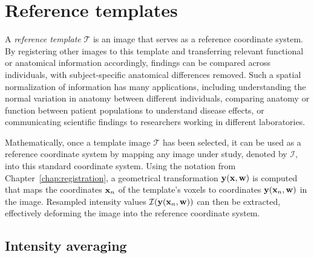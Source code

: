 \documentclass[10pt,twoside]{book}
\begin{document}
\section{Reference templates}
\label{sec:referenceTemplates}

A \emph{reference template} $\mathcal{T}$ is an image that serves as a reference coordinate system. 
By registering other images to this template and transferring relevant functional or anatomical information
accordingly, findings can be compared across individuals, with subject-specific anatomical differences removed.
Such a spatial normalization of information has many applications, including understanding the normal 
variation in anatomy between different individuals, comparing anatomy or function between patient populations to understand disease effects,
or communicating scientific findings to researchers working in different laboratories.

Mathematically, once a template image $\mathcal{T}$ has been selected, it can be used as a reference coordinate system
by mapping any image under study, denoted by $\mathcal{I}$, into this standard coordinate system. Using the notation from
Chapter~\ref{chap:registration}, a geometrical transformation $\mathbf{y}(\mathbf{x},\mathbf{w})$ is computed that maps the coordinates $\mathbf{x}_n$ of the 
template's voxels to coordinates $\mathbf{y}( \mathbf{x}_n, \mathbf{w})$ in the image. Resampled intensity values 
$\mathcal{I}(\mathbf{y}( \mathbf{x}_n, \mathbf{w}))$ can then be extracted, effectively deforming the image into the reference coordinate
system.

\subsection{Intensity averaging}
\end{document}
